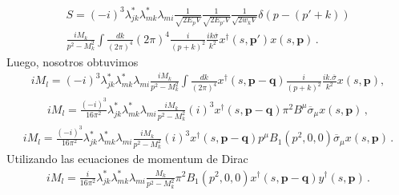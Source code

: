 \begin{align}
S={(-i)^{3}}\lambda^*_{jk}\lambda^*_{mk}\lambda_{mi}\frac{1}{\sqrt{2E_p V}}\frac{1}{\sqrt{2E_{p'} V}}\frac{1}{\sqrt{2w_k 
V}}\delta(p-(p'+k))\\
\frac{iM_{k}}{p^2-M_{k}^2}\int \frac{dk}{(2\pi)^4}(2\pi)^4\frac{i}{(p+k)^2}\frac{ik\overline{\sigma}}{k^2}x^\dagger(s,\boldsymbol{p'})x(s,\boldsymbol{p})\, .
\end{align} 
Luego, nosotros obtuvimos
\begin{align}
iM_{l}={(-i)^{3}}\lambda^*_{jk}\lambda^*_{mk}\lambda_{mi}\frac{iM_{k}}{p^2-M_{k}^2}\int \frac{dk}{(2\pi)^4}x^\dagger(s,\boldsymbol{p-q})\frac{i}{(p+k)^2}\frac{ik.\overline{\sigma}}{k^2}x(s,\boldsymbol{p}),
\end{align}
\begin{align}
iM_{l}=\frac{(-i)^{3}}{16\pi^2}\lambda^*_{jk}\lambda^*_{mk}\lambda_{mi}\frac{iM_{k}}{p^2-M_{k}^2}(i)^3x^\dagger(s,\boldsymbol{p-q})\pi^2B^{\mu}\overline{\sigma}_{\mu} x(s,\boldsymbol{p})\, ,
\end{align}
\begin{align}
iM_{l}=\frac{(-i)^{3}}{16\pi^2}\lambda^*_{jk}\lambda^*_{mk}\lambda_{mi}\frac{iM_{k}}{p^2-M_{k}^2}(i)^3x^\dagger(s,\boldsymbol{p-q})p^{\mu}B_{1}(p^2,0,0)\overline{\sigma}_{\mu} x(s,\boldsymbol{p})\, .
\end{align}
Utilizando las ecuaciones de momentum de Dirac
\begin{align}
iM_{l}=\frac{i}{16\pi^2}\lambda^*_{jk}\lambda^*_{mk}\lambda_{mi}\frac{M_{k}}{p^2-M_{k}^2}\pi^2B_{1}(p^2,0,0)x^\dagger(s,\boldsymbol{p-q})y^\dagger(s,\boldsymbol{p})\, .
\end{align}

